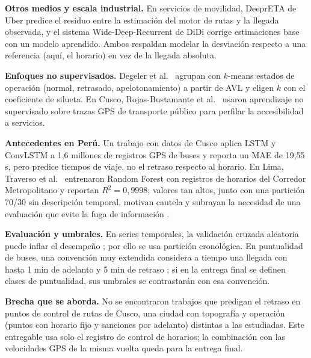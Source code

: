 \documentclass[conference,spanish]{IEEEtran}
\begin{document}
\textbf{Otros medios y escala industrial.} En servicios de movilidad, DeeprETA de Uber \cite{hu2022deepreta} predice el residuo entre la estimación del motor de rutas y la llegada observada, y el sistema Wide-Deep-Recurrent de DiDi \cite{wang2018wdr} corrige estimaciones base con un modelo aprendido. Ambos respaldan modelar la desviación respecto a una referencia (aquí, el horario) en vez de la llegada absoluta.

\textbf{Enfoques no supervisados.} Degeler et al.\ \cite{degeler2021} agrupan con $k$-means estados de operación (normal, retrasado, apelotonamiento) a partir de AVL y eligen $k$ con el coeficiente de silueta. En Cusco, Rojas-Bustamante et al.\ \cite{rojas2023} usaron aprendizaje no supervisado sobre trazas GPS de transporte público para perfilar la accesibilidad a servicios.

\textbf{Antecedentes en Perú.} Un trabajo con datos de Cusco \cite{cusco2024} aplica LSTM y ConvLSTM a 1,6 millones de registros GPS de buses y reporta un MAE de 19,55 s, pero predice tiempos de viaje, no el retraso respecto al horario. En Lima, Traverso et al.\ \cite{traverso2025} entrenaron Random Forest con registros de horarios del Corredor Metropolitano y reportan $R^2=0{,}9998$; valores tan altos, junto con una partición 70/30 sin descripción temporal, motivan cautela y subrayan la necesidad de una evaluación que evite la fuga de información \cite{kaufman2012}.

\textbf{Evaluación y umbrales.} En series temporales, la validación cruzada aleatoria puede inflar el desempeño \cite{bergmeir2012}; por ello se usa partición cronológica. En puntualidad de buses, una convención muy extendida considera a tiempo una llegada con hasta 1 min de adelanto y 5 min de retraso \cite{tcrp2003}; si en la entrega final se definen clases de puntualidad, sus umbrales se contrastarán con esa convención.

\textbf{Brecha que se aborda.} No se encontraron trabajos que predigan el retraso en puntos de control de rutas de Cusco, una ciudad con topografía y operación (puntos con horario fijo y sanciones por adelanto) distintas a las estudiadas. Este entregable usa solo el registro de control de horarios; la combinación con las velocidades GPS de la misma vuelta queda para la entrega final.
\end{document}
